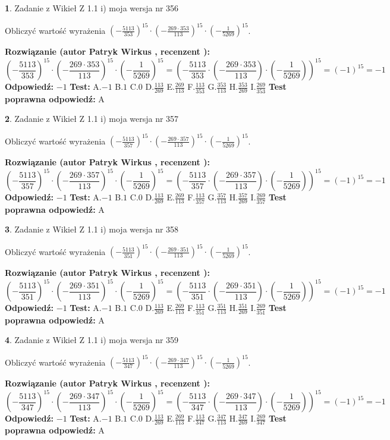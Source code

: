 \documentclass[12pt, a4paper]{article}
\theoremstyle{definition} %
\newtheorem{zad}{}
\newcommand{\zadStart}[1]{\begin{zad}#1\newline}
\newcommand{\zadStop}{\end{zad}}
\newcommand{\rozwStart}[2]{\noindent \textbf{Rozwiązanie (autor #1 , recenzent #2): }\newline}
\newcommand{\rozwStop}{\newline}
\newcommand{\odpStart}{\noindent \textbf{Odpowiedź:}\newline}
\newcommand{\odpStop}{\newline}
\newcommand{\testStart}{\noindent \textbf{Test:}\newline}
\newcommand{\testStop}{\newline}
\newcommand{\kluczStart}{\noindent \textbf{Test poprawna odpowiedź:}\newline}
\newcommand{\kluczStop}{\newline}
\begin{document}
\zadStart{Zadanie z Wikieł Z 1.1 i) moja wersja nr 356}

Obliczyć wartość wyrażenia $(-\frac{5113}{353})^{15} \cdot (-\frac{269 \cdot 353}{113})^{15} \cdot (-\frac{1}{5269})^{15}$.
\zadStop
\rozwStart{Patryk Wirkus}{}
$$(-\frac{5113}{353})^{15} \cdot (-\frac{269 \cdot 353}{113})^{15} \cdot (-\frac{1}{5269})^{15} = (-\frac{5113}{353} \cdot (-\frac{269 \cdot 353}{113}) \cdot (-\frac{1}{5269}))^{15} = (-1)^{15} = -1$$
\rozwStop
\odpStart
$-1$
\odpStop
\testStart
A.$-1$ B.$1$ C.$0$ D.$\frac{113}{269}$ E.$\frac{269}{113}$
F.$\frac{113}{353}$ G.$\frac{353}{113}$
H.$\frac{353}{269}$
I.$\frac{269}{353}$
\testStop
\kluczStart
A
\kluczStop



\zadStart{Zadanie z Wikieł Z 1.1 i) moja wersja nr 357}

Obliczyć wartość wyrażenia $(-\frac{5113}{357})^{15} \cdot (-\frac{269 \cdot 357}{113})^{15} \cdot (-\frac{1}{5269})^{15}$.
\zadStop
\rozwStart{Patryk Wirkus}{}
$$(-\frac{5113}{357})^{15} \cdot (-\frac{269 \cdot 357}{113})^{15} \cdot (-\frac{1}{5269})^{15} = (-\frac{5113}{357} \cdot (-\frac{269 \cdot 357}{113}) \cdot (-\frac{1}{5269}))^{15} = (-1)^{15} = -1$$
\rozwStop
\odpStart
$-1$
\odpStop
\testStart
A.$-1$ B.$1$ C.$0$ D.$\frac{113}{269}$ E.$\frac{269}{113}$
F.$\frac{113}{357}$ G.$\frac{357}{113}$
H.$\frac{357}{269}$
I.$\frac{269}{357}$
\testStop
\kluczStart
A
\kluczStop



\zadStart{Zadanie z Wikieł Z 1.1 i) moja wersja nr 358}

Obliczyć wartość wyrażenia $(-\frac{5113}{351})^{15} \cdot (-\frac{269 \cdot 351}{113})^{15} \cdot (-\frac{1}{5269})^{15}$.
\zadStop
\rozwStart{Patryk Wirkus}{}
$$(-\frac{5113}{351})^{15} \cdot (-\frac{269 \cdot 351}{113})^{15} \cdot (-\frac{1}{5269})^{15} = (-\frac{5113}{351} \cdot (-\frac{269 \cdot 351}{113}) \cdot (-\frac{1}{5269}))^{15} = (-1)^{15} = -1$$
\rozwStop
\odpStart
$-1$
\odpStop
\testStart
A.$-1$ B.$1$ C.$0$ D.$\frac{113}{269}$ E.$\frac{269}{113}$
F.$\frac{113}{351}$ G.$\frac{351}{113}$
H.$\frac{351}{269}$
I.$\frac{269}{351}$
\testStop
\kluczStart
A
\kluczStop



\zadStart{Zadanie z Wikieł Z 1.1 i) moja wersja nr 359}

Obliczyć wartość wyrażenia $(-\frac{5113}{347})^{15} \cdot (-\frac{269 \cdot 347}{113})^{15} \cdot (-\frac{1}{5269})^{15}$.
\zadStop
\rozwStart{Patryk Wirkus}{}
$$(-\frac{5113}{347})^{15} \cdot (-\frac{269 \cdot 347}{113})^{15} \cdot (-\frac{1}{5269})^{15} = (-\frac{5113}{347} \cdot (-\frac{269 \cdot 347}{113}) \cdot (-\frac{1}{5269}))^{15} = (-1)^{15} = -1$$
\rozwStop
\odpStart
$-1$
\odpStop
\testStart
A.$-1$ B.$1$ C.$0$ D.$\frac{113}{269}$ E.$\frac{269}{113}$
F.$\frac{113}{347}$ G.$\frac{347}{113}$
H.$\frac{347}{269}$
I.$\frac{269}{347}$
\testStop
\kluczStart
A
\kluczStop
\end{document}

